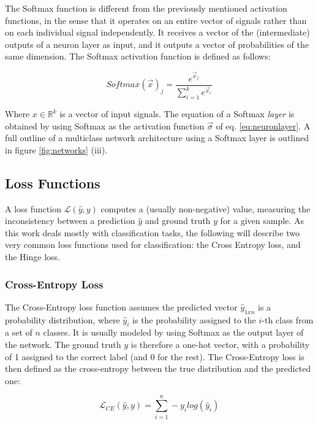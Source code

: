 The Softmax function is different from the previously mentioned activation functions, in the sense that it operates on an entire vector of signals rather than on each individual signal independently. It receives a vector of the (intermediate) outputs of a neuron layer as input, and it outputs a vector of probabilities of the same dimension. The Softmax activation function is defined as follows:

\begin{equation}
    Softmax( \vec{x} )_j = \frac{e^{\vec{x}_j}}{\sum_{i=1}^k e^{\vec{x}_i}}
    \label{eq:softmax}
\end{equation}

Where $x \in \mathbb{R}^k$ is a vector of input signals. The equation of a Softmax \emph{layer} is obtained by using Softmax as the activation function \(\vec{\sigma}\) of eq.  \ref{eq:neuronlayer}. A full outline of a multiclass network architecture using a Softmax layer is outlined in figure \ref{fig:networks} (iii).

\subsection{Loss Functions}

A loss function $\mathcal{L}(\hat{y}, y)$ computes a (usually non-negative) value, measuring the inconsistency between a prediction $\hat{y}$ and ground truth $y$ for a given sample. 
As this work deals mostly with classification tasks, the following will describe two very common loss functions used for classification: the Cross Entropy loss, and the Hinge loss.

\subsubsection{Cross-Entropy Loss}
The Cross-Entropy loss function assumes the predicted vector $\hat{y}_{1xn}$ is a probability distribution, where $\hat{y}_i$ is the probability assigned to the $i$-th class from a set of $n$ classes. It is usually modeled by using Softmax as the output layer of the network. The ground truth $y$ is therefore a one-hot vector, with a probability of 1 assigned to the correct label (and 0 for the rest). The Cross-Entropy loss is then defined as the cross-entropy between the true distribution and the predicted one:

\begin{equation}
    \mathcal{L}_{CE}(\hat{y}, y) = \sum_{i=1}^{n} -y_{i}log(\hat{y}_i)
    \label{crossentropy}
\end{equation}

